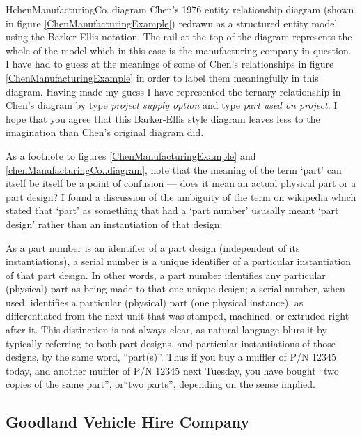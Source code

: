 \begin{erboxedFigure} {H}{chenManufacturingCo..diagram}{
Chen's 1976 entity relationship diagram (shown in figure \ref{ChenManufacturingExample}) 
redrawn as a structured entity model using the Barker-Ellis notation. 
 The rail at the top of the diagram represents the whole of the model which in this case is the manufacturing company in question.
I have had to guess at the meanings of some of Chen's relationships in figure \ref{ChenManufacturingExample}
 in order to label them meaningfully in this diagram. 
Having made my guess I have represented  the ternary relationship in Chen's diagram by type \textit{project supply option} and type \textit{part used on project}. 
I hope that you agree that this Barker-Ellis style diagram leaves less to the imagination than Chen's original diagram did.
}
\scalebox{0.95}{}
\end{erboxedFigure}
As a footnote to figures \ref{ChenManufacturingExample} and \ref{chenManufacturingCo..diagram}, 
note that the  meaning of the term  `part' can itself be itself be a point of confusion ---
does it mean an actual physical part or  a part design?
I found a discussion of the ambiguity of the term  on wikipedia which stated that `part' as something that had a `part number' ususally meant `part design' rather than an instantiation of that design:
\begin{erquote}
As a part number is an identifier of a part design (independent of its instantiations), a serial number is a unique identifier of a particular instantiation of that part design. In other words, a part number identifies any particular (physical) part as being made to that one unique design; a serial number, when used, identifies a particular (physical) part (one physical instance), as differentiated from the next unit that was stamped, machined, or extruded right after it. This distinction is not always clear, as natural language blurs it by typically referring to both part designs, and particular instantiations of those designs, by the same word, ``part(s)''. Thus if you buy a muffler of P/N 12345 today, and another muffler of P/N 12345 next Tuesday, you have bought ``two copies of the same part'', or``two parts'', depending on the sense implied.
\end{erquote}

\subsection{Goodland Vehicle Hire Company}
\label{GoodlandVehicleHireCompany}

